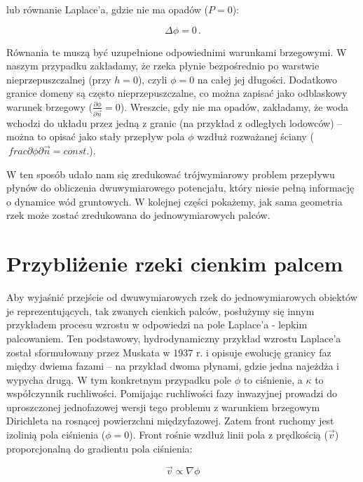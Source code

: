 \documentclass[]{pracamgr}
\begin{document}
      lub równanie Laplace'a, gdzie nie ma opadów ($P=0$):
      
      \begin{equation}\label{laplace}
    		\Delta \phi = 0 \,.
    	\end{equation}	

      Równania te muszą być uzupełnione odpowiednimi warunkami brzegowymi. W naszym przypadku zakładamy, że rzeka płynie bezpośrednio po warstwie nieprzepuszczalnej (przy $h = 0$), czyli $\phi = 0$ na całej jej długości. Dodatkowo granice domeny są często nieprzepuszczalne, co można zapisać jako odblaskowy warunek brzegowy ($\frac{\partial \phi} {\partial \vec{n}} = 0$). Wreszcie, gdy nie ma opadów, zakładamy, że woda wchodzi do układu przez jedną z granic (na przykład z odległych lodowców) -- można to opisać jako stały przepływ pola $\phi$ wzdłuż rozważanej ściany ($\ frac{\partial \phi} {\partial \vec{n}} = const.$).
      
      W ten sposób udało nam się zredukować trójwymiarowy problem przepływu płynów do obliczenia dwuwymiarowego potencjału, który niesie pełną informację o dynamice wód gruntowych. W kolejnej części pokażemy, jak sama geometria rzek może zostać zredukowana do jednowymiarowych palców.

    \section{Przybliżenie rzeki cienkim palcem}

      Aby wyjaśnić przejście od dwuwymiarowych rzek do jednowymiarowych obiektów je reprezentujących, tak zwanych cienkich palców, posłużymy się innym przykładem procesu wzrostu w odpowiedzi na pole Laplace'a - lepkim palcowaniem. Ten podstawowy, hydrodynamiczny przykład wzrostu Laplace'a został sformułowany przez Muskata w 1937 r. \cite{muskat1937flow} i opisuje ewolucję granicy faz między dwiema fazami -- na przykład dwoma płynami, gdzie jedna najeżdża i wypycha drugą. W tym konkretnym przypadku pole $\phi$ to ciśnienie, a $\kappa$ to współczynnik ruchliwości. Pomijając ruchliwości fazy inwazyjnej prowadzi do uproszczonej jednofazowej wersji tego problemu z warunkiem brzegowym Dirichleta na rosnącej powierzchni międzyfazowej. Zatem front ruchomy jest izolinią pola ciśnienia ($\phi = 0$). Front rośnie wzdłuż linii pola z prędkością ($\vec{v}$) proporcjonalną do gradientu pola ciśnienia:
      
      \begin{equation}
        \vec{v} \propto \nabla \phi
      \end{equation}
\end{document}
